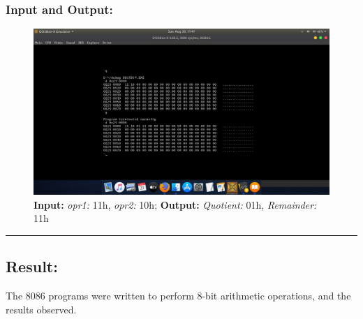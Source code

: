 \documentclass[12pt,a4paper]{article}
\begin{document}
\begin{flushleft}
\subsubsection*{\textbf{Input and Output:}}
\begin{figure}[h]
    \centering
    \includegraphics[trim = 100mm 70mm 100mm 80mm, clip, width = \textwidth]{Division.png}
    \caption{ \textbf{Input:} \emph{opr1:} 11h, \emph{opr2:} 10h; 
              \textbf{Output:} \emph{Quotient:} 01h, \emph{Remainder:} 11h}
\end{figure}

\hrule
\subsection*{\textbf{Result:}}
The 8086 programs were written to perform 8-bit arithmetic operations, and the results observed.
\end{flushleft}
\end{document}
